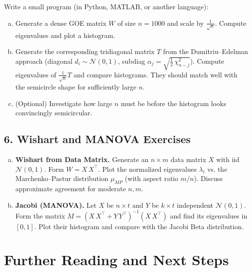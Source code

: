 \documentclass[letterpaper,11pt,oneside,reqno]{article}
\numberwithin{equation}{section}
\theoremstyle{definition}
\begin{document}
Write a small program (in Python, MATLAB, or another language):
\begin{enumerate}[(a)]
\item Generate a dense GOE matrix $W$ of size $n=1000$ and scale by $\frac{1}{\sqrt{n}}$. Compute eigenvalues and plot a histogram.
\item Generate the corresponding tridiagonal matrix $T$ from the Dumitriu--Edelman approach (diagonal $d_i\sim \mathcal{N}(0,1)$, subdiag $\alpha_j= \sqrt{\tfrac12\,\chi^2_{n-j}}$). Compute eigenvalues of $\frac{1}{\sqrt{n}}T$ and compare histograms. They should match well with the semicircle shape for sufficiently large $n$.
\item (Optional) Investigate how large $n$ must be before the histogram looks convincingly semicircular.
\end{enumerate}

\subsection*{6. Wishart and MANOVA Exercises}

\begin{enumerate}[(a)]
\item {\bf Wishart from Data Matrix.} Generate an $n\times m$ data matrix $X$ with iid $\mathcal{N}(0,1)$. Form $W=X\,X^\top$. Plot the normalized eigenvalues $\lambda_i$ vs. the Marchenko–Pastur distribution $\mu_{MP}$ (with aspect ratio $m/n$). Discuss approximate agreement for moderate $n,m$.
\item {\bf Jacobi (MANOVA).} Let $X$ be $n\times t$ and $Y$ be $k\times t$ independent $\mathcal{N}(0,1)$. Form the matrix $M=(X\,X^\top +Y\,Y^\top)^{-1} (X\,X^\top)$ and find its eigenvalues in $[0,1]$. Plot their histogram and compare with the Jacobi Beta distribution.
\end{enumerate}

\section{Further Reading and Next Steps}
\end{document}
